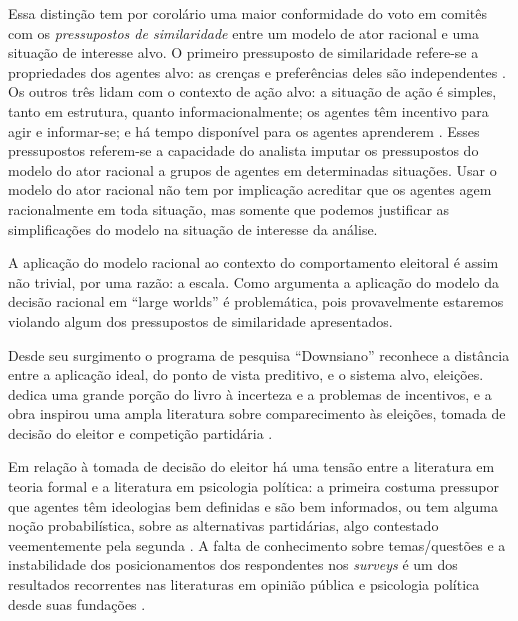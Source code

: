 Essa distinção tem por corolário uma maior conformidade do voto em comitês com
os \textit{pressupostos de similaridade} entre um modelo de ator racional e uma
situação de interesse alvo. O primeiro pressuposto de similaridade refere-se a
propriedades dos agentes alvo: as crenças e preferências deles são independentes
\cite{binmore2008rational}. Os outros três lidam com o contexto de ação alvo: a
situação de ação é simples, tanto em estrutura, quanto informacionalmente; os
agentes têm incentivo para agir e informar-se; e há tempo disponível para os
agentes aprenderem \cite{binmore2007work, page2008uncertainty}. Esses
pressupostos referem-se a capacidade do analista imputar os pressupostos do
modelo do ator racional a grupos de agentes em determinadas situações. Usar o
modelo do ator racional não tem por implicação acreditar que os agentes agem
racionalmente em toda situação, mas somente que podemos justificar as
simplificações do modelo na situação de interesse da análise.

A aplicação do modelo racional ao contexto do comportamento eleitoral é assim
não trivial, por uma razão: a escala. Como argumenta 
a aplicação do modelo da decisão racional em  ``large worlds'' é problemática,
pois provavelmente estaremos violando algum dos pressupostos de similaridade
apresentados.

Desde seu surgimento o programa de pesquisa ``Downsiano'' reconhece a distância
entre a aplicação ideal, do ponto de vista preditivo, e o sistema alvo,
eleições.  dedica uma grande porção do livro à
incerteza e a problemas de incentivos, e a obra inspirou uma ampla literatura
sobre comparecimento às eleições, tomada de decisão do eleitor e competição
partidária \cite{bendor2011behavioral}.

Em relação à tomada de decisão do eleitor há uma tensão entre a literatura em
teoria formal e a literatura em psicologia política: a primeira costuma
pressupor que agentes têm ideologias bem definidas e são bem informados, ou tem
alguma noção probabilística, sobre as alternativas partidárias, algo contestado
veementemente pela segunda \cite[p.5]{bendor2011behavioral}. A falta de
conhecimento sobre temas/questões e a instabilidade dos posicionamentos dos
respondentes nos \textit{surveys} é um dos resultados recorrentes nas
literaturas em opinião pública e psicologia política desde suas fundações
\cite{berelson1952democratic, converse2006nature, zaller1992simple,
  kuklinski2000misinformation}.

